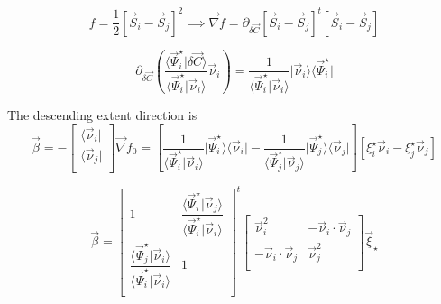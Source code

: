 \documentclass[aps,12pt]{revtex4}
\begin{document}
\begin{equation}
	f = \dfrac{1}{2} \left[ \vec{S}_i - \vec{S}_j\right]^2 \implies \vec{\nabla} f = \partial_{\delta\vec{C}} \left[ \vec{S}_i - \vec{S}_j\right]^t \left[ \vec{S}_i - \vec{S}_j\right]
\end{equation}

\begin{equation}
	\partial_{\delta\vec{C}} \left(\dfrac{\langle \vec{\Psi}_i^\star \vert \delta\vec{C} \rangle}{\langle \vec{\Psi}_i^\star \vert \vec{\nu}_i \rangle}  \vec{\nu}_i \right)
	= \dfrac{1}{\langle \vec{\Psi}_i^\star \vert \vec{\nu}_i \rangle} \vert\vec{\nu}_i\rangle \langle\vec{\Psi}_i^\star \vert
\end{equation}

The descending extent direction is
\begin{equation}
	\vec{\beta} = - 
	\begin{bmatrix}
	\langle\vec{\nu}_i\vert\\
	\langle\vec{\nu}_j\vert\\
	\end{bmatrix}
	\vec{\nabla} f_0 =
	\left[
	 \dfrac{1}{\langle \vec{\Psi}_i^\star \vert \vec{\nu}_i \rangle}  \vert\vec{\Psi}_i^\star \rangle \langle\vec{\nu}_i\vert
	-
	\dfrac{1}{\langle \vec{\Psi}_j^\star \vert \vec{\nu}_j \rangle}  \vert\vec{\Psi}_j^\star \rangle \langle\vec{\nu}_j\vert
	 \right] \left[ \xi_i^\star \vec{\nu}_i - \xi_j^\star \vec{\nu}_j \right]
\end{equation}

\begin{equation}
	\vec{\beta} = 
	\begin{bmatrix}
	1 & \dfrac{\langle \vec{\Psi}_i^\star \vert \vec{\nu}_j\rangle }{\langle \vec{\Psi}_i^\star \vert \vec{\nu}_i\rangle}\\
	\dfrac{\langle \vec{\Psi}_j^\star \vert \vec{\nu}_i\rangle }{\langle \vec{\Psi}_i^\star \vert \vec{\nu}_i\rangle} & 1 \\
	\end{bmatrix}^t
	\begin{bmatrix}
	\vec{\nu}_i^2 & -\vec{\nu}_i \cdot \vec{\nu}_j\\
	-\vec{\nu}_i \cdot \vec{\nu}_j & \vec{\nu}_j^2\\
	\end{bmatrix}
	\vec{\xi}_\star
\end{equation}
\end{document}
